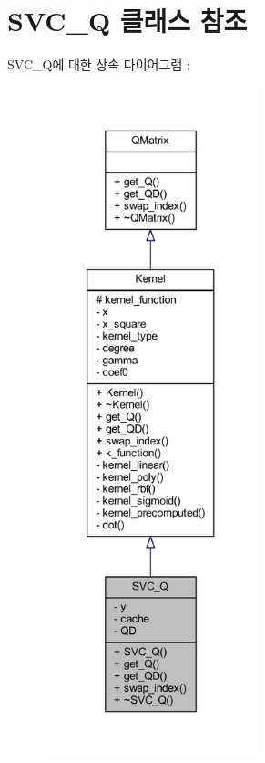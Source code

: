 \hypertarget{class_s_v_c___q}{\section{S\+V\+C\+\_\+\+Q 클래스 참조}
\label{class_s_v_c___q}
}


S\+V\+C\+\_\+\+Q에 대한 상속 다이어그램 \+: 
\nopagebreak
\begin{figure}[H]
\begin{center}
\leavevmode
\includegraphics[height=550pt]{class_s_v_c___q__inherit__graph}
\end{center}
\end{figure}


